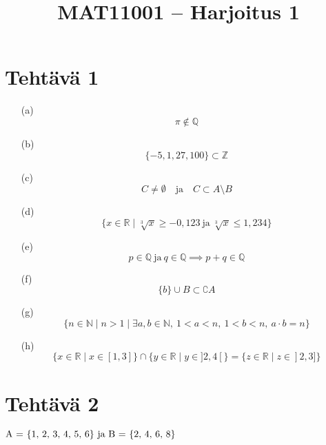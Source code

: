 \documentclass{article}
\begin{document}
	
	\title{MAT11001 – Harjoitus 1}
	\date{}
	\maketitle
	
	
	\section*{Tehtävä 1}

	
\begin{enumerate}


	\item[(a)]
	\[
	\pi \notin \mathbb{Q}
	\]	
	
	\item[(b)]
	\[
	\{-5, 1, 27, 100\} \subset \mathbb{Z}
	\]

	\item[(c)]
	\[
	C \neq \emptyset \quad \text{ja} \quad C \subset A \setminus B
	\]

	\item[(d)]
	\[
	\{ x \in \mathbb{R} \mid  \sqrt[3]{x} \geq -0,123 \ \text{ja} \  \sqrt[3]{x} \leq 1,234 \}
	\]

	\item[(e)]
	\[
	p \in \mathbb{Q} \ \text{ja} \ q \in \mathbb{Q} \implies p + q \in \mathbb{Q}
	\]

	\item[(f)]
	\[
	\{b\} \cup B \subset \complement A
	\]

	\item[(g)]
	\[
	\{n \in \mathbb{N} \mid n > 1 \mid \exists a, b \in \mathbb{N}, \ 1 < a < n, \ 1 < b < n, \ a \cdot b = n \} 
	\]

	\item[(h)]
	\[
	\{ x \in \mathbb{R} \mid x \in [1, 3]\} \cap \{ y \in \mathbb{R} \mid y \in ]2, 4[\} = \{ z \in \mathbb{R} \mid z \in ]2, 3]\}
	\]

	
\end{enumerate}




\newpage

	\section*{Tehtävä 2}

	\( $A = \{1, 2, 3, 4, 5, 6\}$ \ \text{ja} \ $B = \{2, 4, 6, 8\}$\)
\end{document}
